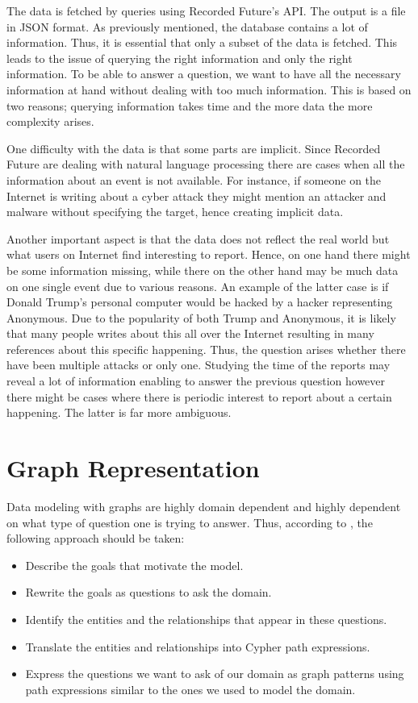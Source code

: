 The data is fetched by queries using Recorded Future's API. The output is a file in JSON format. As previously mentioned, the database contains a lot of information. Thus, it is essential that only a subset of the data is fetched. This leads to the issue of querying the right information and only the right information. To be able to answer a question, we want to have all the necessary information at hand without dealing with too much information. This is based on two reasons; querying information takes time and the more data the more complexity arises.

One difficulty with the data is that some parts are implicit. Since Recorded Future are dealing with natural language processing there are cases when all the information about an event is not available. For instance, if someone on the Internet is writing about a cyber attack they might mention an attacker and malware without specifying the target, hence creating implicit data.

Another important aspect is that the data does not reflect the real world but what users on Internet find interesting to report. Hence, on one hand there might be some information missing, while there on the other hand may be much data on one single event due to various reasons. An example of the latter case is if Donald Trump's personal computer would be hacked by a hacker representing Anonymous. Due to the popularity of both Trump and Anonymous, it is likely that many people writes about this all over the Internet resulting in many references about this specific happening. Thus, the question arises whether there have been multiple attacks or only one. Studying the time of the reports may reveal a lot of information enabling to answer the previous question however there might be cases where there is periodic interest to report about a certain happening. The latter is far more ambiguous.

\section{Graph Representation}
Data modeling with graphs are highly domain dependent and highly dependent on what type of question one is trying to answer. Thus, according to \citet{robinson2013}, the following approach should be taken:
\begin{itemize}
    \item Describe the goals that motivate the model.
    \item Rewrite the goals as questions to ask the domain.
    \item Identify the entities and the relationships that appear in these questions. 
    \item Translate the entities and relationships into Cypher path expressions.
    \item Express the questions we want to ask of our domain as graph patterns using path expressions similar to the ones we used to model the domain. 
\end{itemize}

